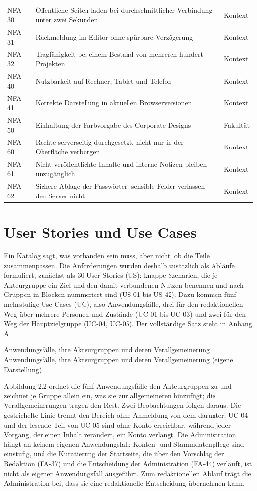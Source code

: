 \begin{longtable}{@{}L{1.7cm}L{9.0cm}L{3.8cm}@{}}
	NFA-30 & Öffentliche Seiten laden bei durchschnittlicher Verbindung unter zwei Sekunden & Kontext \\
	NFA-31 & Rückmeldung im Editor ohne spürbare Verzögerung & Kontext \\
	NFA-32 & Tragfähigkeit bei einem Bestand von mehreren hundert Projekten & Kontext \\
	NFA-40 & Nutzbarkeit auf Rechner, Tablet und Telefon & Kontext \\
	NFA-41 & Korrekte Darstellung in aktuellen Browserversionen & Kontext \\
	NFA-50 & Einhaltung der Farbvorgabe des Corporate Designs & Fakultät \\
	NFA-60 & Rechte serverseitig durchgesetzt, nicht nur in der Oberfläche verborgen & Kontext \\
	NFA-61 & Nicht veröffentlichte Inhalte und interne Notizen bleiben unzugänglich & Kontext \\
	NFA-62 & Sichere Ablage der Passwörter, sensible Felder verlassen den Server nicht & Kontext \\
\end{longtable}
\endgroup

\section{User Stories und Use Cases}
\label{sec:user-stories}

Ein Katalog sagt, was vorhanden sein muss, aber nicht, ob die Teile zusammenpassen. Die Anforderungen wurden deshalb zusätzlich als Abläufe formuliert, zunächst als 30 User Stories (US): knappe Szenarien, die je Akteurgruppe ein Ziel und den damit verbundenen Nutzen benennen und nach Gruppen in Blöcken nummeriert sind (US-01 bis US-42). Dazu kommen fünf mehrstufige Use Cases (UC), also Anwendungsfälle, drei für den redaktionellen Weg über mehrere Personen und Zustände (UC-01 bis UC-03) und zwei für den Weg der Hauptzielgruppe (UC-04, UC-05). Der vollständige Satz steht in Anhang A.

%
{Anwendungsfälle, ihre Akteurgruppen und deren Verallgemeinerung}%
{Anwendungsfälle, ihre Akteurgruppen und deren Verallgemeinerung (eigene Darstellung)}

Abbildung 2.2 ordnet die fünf Anwendungsfälle den Akteurgruppen zu und zeichnet je Gruppe allein ein, was sie zur allgemeineren hinzufügt; die Verallgemeinerungen tragen den Rest. Zwei Beobachtungen folgen daraus. Die gestrichelte Linie trennt den Bereich ohne Anmeldung von dem darunter: UC-04 und der lesende Teil von UC-05 sind ohne Konto erreichbar, während jeder Vorgang, der einen Inhalt verändert, ein Konto verlangt. Die Administration hängt an keinem eigenen Anwendungsfall: Konten- und Stammdatenpflege sind einstufig, und die Kuratierung der Startseite, die über den Vorschlag der Redaktion (FA-37) und die Entscheidung der Administration (FA-44) verläuft, ist nicht als eigener Anwendungsfall ausgeführt. Zum redaktionellen Ablauf trägt die Administration bei, dass sie eine redaktionelle Entscheidung übernehmen kann.

